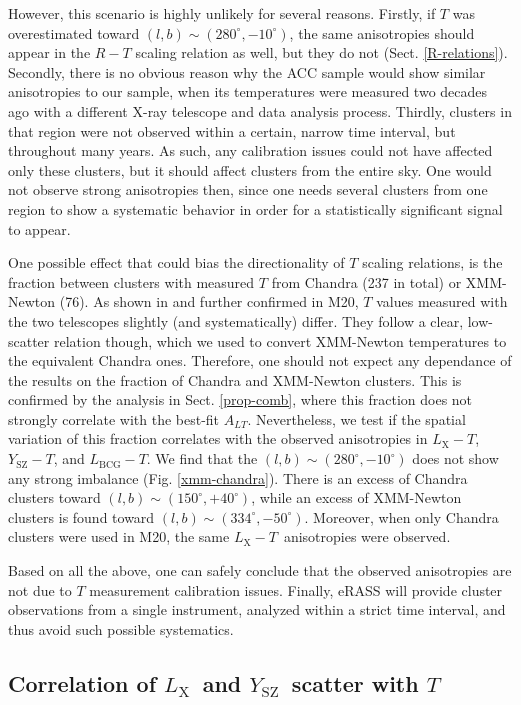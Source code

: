 \documentclass{aa}   %
\newcommand{\LT}{$L_{\text{X}}-T$}
\newcommand{\YT}{$Y_{\text{SZ}}-T$}
\newcommand{\LbcgT}{$L_{\text{BCG}}-T$}
\newcommand{\Lx}{$L_{\text{X}}$}
\newcommand{\Ysz}{$Y_{\text{SZ}}$}
\begin{document}
However, this scenario is highly unlikely for several reasons. Firstly, if $T$ was overestimated toward $(l,b)\sim (280^{\circ}, -10^{\circ})$, the same anisotropies should appear in the $R-T$ scaling relation as well, but they do not (Sect. \ref{R-relations}). Secondly, there is no obvious reason why the ACC sample would show similar anisotropies to our sample, when its temperatures were measured two decades ago with a different X-ray telescope and data analysis process. Thirdly, clusters in that region were not observed within a certain, narrow time interval, but throughout many years. As such, any calibration issues could not have affected only these clusters, but it should affect clusters from the entire sky. One would not observe strong anisotropies then, since one needs several clusters from one region to show a systematic behavior in order for a statistically significant signal to appear.

One possible effect that could bias the directionality of $T$ scaling relations, is the fraction between clusters with measured $T$ from Chandra (237 in total) or XMM-Newton (76). As shown in \citet{schellenberger} and further confirmed in M20, $T$ values measured with the two telescopes slightly (and systematically) differ. They follow a clear, low-scatter relation though, which we used to convert XMM-Newton temperatures to the equivalent Chandra ones. Therefore, one should not expect any dependance of the results on the fraction of Chandra and XMM-Newton clusters. This is confirmed by the analysis in Sect. \ref{prop-comb}, where this fraction does not strongly correlate with the best-fit $A_{LT}$. Nevertheless, we test if the spatial variation of this fraction correlates with the observed anisotropies in \LT, \YT, and \LbcgT. We find that the $(l,b)\sim (280^{\circ}, -10^{\circ})$ does not show any strong imbalance (Fig. \ref{xmm-chandra}). There is an excess of Chandra clusters toward $(l,b)\sim (150^{\circ}, +40^{\circ})$, while an excess of XMM-Newton clusters is found toward $(l,b)\sim (334^{\circ}, -50^{\circ})$. Moreover, when only Chandra clusters were used in M20, the same \LT\ anisotropies were observed.

Based on all the above, one can safely conclude that the observed anisotropies are not due to $T$ measurement calibration issues. Finally, eRASS will provide cluster observations from a single instrument, analyzed within a strict time interval, and thus avoid such possible systematics.

\subsection{Correlation of \Lx\ and \Ysz\ scatter with $T$}\label{scatter_corr}
\end{document}
